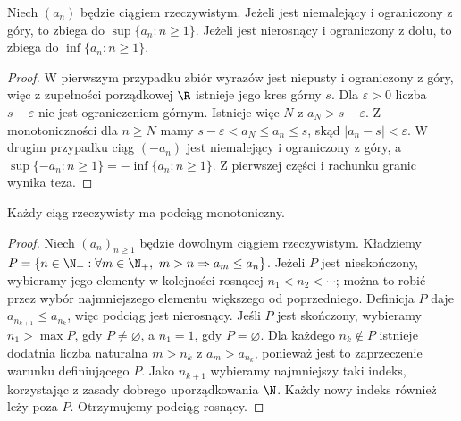 \begin{twierdzenie}
\label{ma1:thm:monotone-convergence}
Niech $(a_n)$ będzie ciągiem rzeczywistym. Jeżeli jest niemalejący i ograniczony z góry, to zbiega do $\sup\{a_n:n\ge1\}$. Jeżeli jest nierosnący i ograniczony z dołu, to zbiega do $\inf\{a_n:n\ge1\}$.
\end{twierdzenie}
\begin{proof}
W pierwszym przypadku zbiór wyrazów jest niepusty i ograniczony z góry, więc z zupełności porządkowej $\R$ istnieje jego kres górny $s$. Dla $\varepsilon>0$ liczba $s-\varepsilon$ nie jest ograniczeniem górnym. Istnieje więc $N$ z $a_N>s-\varepsilon$. Z monotoniczności dla $n\ge N$ mamy $s-\varepsilon<a_N\le a_n\le s$, skąd $|a_n-s|<\varepsilon$. W drugim przypadku ciąg $(-a_n)$ jest niemalejący i ograniczony z góry, a $\sup\{-a_n:n\ge1\}=-\inf\{a_n:n\ge1\}$. Z pierwszej części i rachunku granic wynika teza.
\end{proof}
\begin{twierdzenie}
\label{ma1:thm:monotone-subsequence}
Każdy ciąg rzeczywisty ma podciąg monotoniczny.
\end{twierdzenie}
\begin{proof}
Niech $(a_n)_{n\ge1}$ będzie dowolnym ciągiem rzeczywistym. Kładziemy $P=\{n\in\N_+:\forall m\in\N_+,\ m>n\Rightarrow a_m\le a_n\}$. Jeżeli $P$ jest nieskończony, wybieramy jego elementy w kolejności rosnącej $n_1<n_2<\cdots$; można to robić przez wybór najmniejszego elementu większego od poprzedniego. Definicja $P$ daje $a_{n_{k+1}}\le a_{n_k}$, więc podciąg jest nierosnący.
Jeśli $P$ jest skończony, wybieramy $n_1>\max P$, gdy $P\ne\varnothing$, a $n_1=1$, gdy $P=\varnothing$. Dla każdego $n_k\notin P$ istnieje dodatnia liczba naturalna $m>n_k$ z $a_m>a_{n_k}$, ponieważ jest to zaprzeczenie warunku definiującego $P$. Jako $n_{k+1}$ wybieramy najmniejszy taki indeks, korzystając z zasady dobrego uporządkowania $\N$. Każdy nowy indeks również leży poza $P$. Otrzymujemy podciąg rosnący.
\end{proof}


